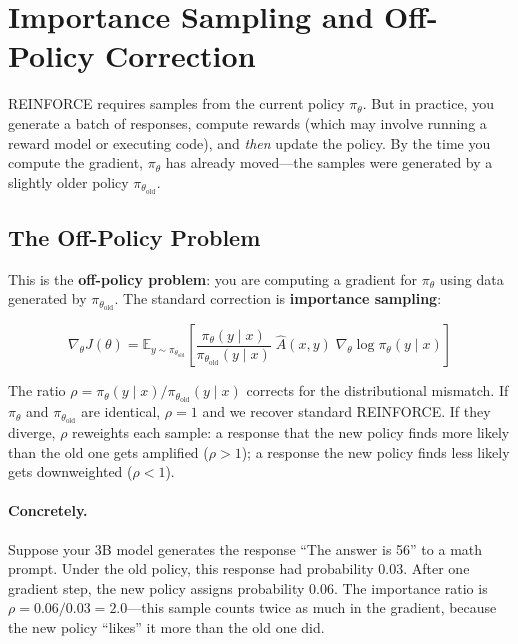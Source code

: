 \section{Importance Sampling and Off-Policy Correction}
\label{sec:importance-sampling}

REINFORCE requires samples from the current policy $\pi_\theta$. But in practice, you generate a batch of responses, compute rewards (which may involve running a reward model or executing code), and \emph{then} update the policy. By the time you compute the gradient, $\pi_\theta$ has already moved---the samples were generated by a slightly older policy $\pi_{\theta_{\text{old}}}$.

\subsection{The Off-Policy Problem}

This is the \textbf{off-policy problem}: you are computing a gradient for $\pi_\theta$ using data generated by $\pi_{\theta_{\text{old}}}$. The standard correction is \textbf{importance sampling}:

\begin{equation}
\label{eq:importance-sampling}
\nabla_\theta J(\theta) = \mathbb{E}_{y \sim \pi_{\theta_{\text{old}}}}\!\left[\frac{\pi_\theta(y \mid x)}{\pi_{\theta_{\text{old}}}(y \mid x)} \; \hat{A}(x, y) \; \nabla_\theta \log \pi_\theta(y \mid x)\right]
\end{equation}

The ratio $\rho = \pi_\theta(y \mid x) / \pi_{\theta_{\text{old}}}(y \mid x)$ corrects for the distributional mismatch. If $\pi_\theta$ and $\pi_{\theta_{\text{old}}}$ are identical, $\rho = 1$ and we recover standard REINFORCE. If they diverge, $\rho$ reweights each sample: a response that the new policy finds more likely than the old one gets amplified ($\rho > 1$); a response the new policy finds less likely gets downweighted ($\rho < 1$).

\paragraph{Concretely.} Suppose your 3B model generates the response ``The answer is 56'' to a math prompt. Under the old policy, this response had probability $0.03$. After one gradient step, the new policy assigns probability $0.06$. The importance ratio is $\rho = 0.06 / 0.03 = 2.0$---this sample counts twice as much in the gradient, because the new policy ``likes'' it more than the old one did.


